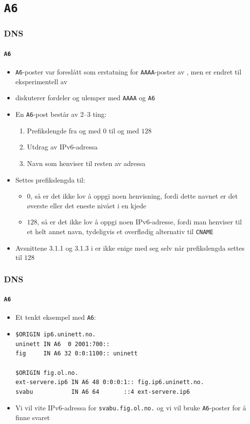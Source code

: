 \section{\texttt{A6}}
\begin{frame}[fragile]%
  \frametitle{DNS}
  \framesubtitle{\texttt{A6}}
  \pause
  \begin{itemize}[<+->]
  \item \texttt{A6}-poster var foreslått som erstatning for
    \texttt{AAAA}-poster av , men er endret til
    eksperimentell av 
  \item {} diskuterer
    fordeler og ulemper med \texttt{AAAA} og \texttt{A6}
  \item En \texttt{A6}-post består av 2--3 ting:
    \begin{enumerate}[<+->]
    \item Prefikslengde fra og med $0$ til og med $128$
    \item Utdrag av IPv6-adressa
    \item Navn som henviser til resten av adressa
    \end{enumerate}
  \item Settes prefikslengda til:
    \begin{itemize}[<+->]
    \item $0$, så er det \alert{ikke} lov å oppgi noen henvisning,
      fordi dette navnet er det øverste eller det eneste nivået i en
      kjede
    \item $128$, så er det \alert{ikke} lov å oppgi noen IPv6-adresse,
      fordi man henviser til et helt annet navn, tydeligvis et
      overflødig alternativ til \texttt{CNAME}
    \end{itemize}
  \item Avsnittene 3.1.1 og 3.1.3 i  er ikke enige med seg
    selv når prefikslengda settes til $128$
  \end{itemize}
\end{frame}

\begin{frame}[fragile]%
  \frametitle{DNS}
  \framesubtitle{\texttt{A6}}
  \begin{itemize}[<+->]
  \item Et tenkt eksempel med \texttt{A6}:
  \item 
\begin{verbatim}
$ORIGIN ip6.uninett.no.
uninett IN A6  0 2001:700::
fig     IN A6 32 0:0:1100:: uninett

$ORIGIN fig.ol.no.
ext-servere.ip6 IN A6 48 0:0:0:1:: fig.ip6.uninett.no.
svabu           IN A6 64       ::4 ext-servere.ip6
\end{verbatim}
  \item Vi vil vite IPv6-adressa for \texttt{svabu.fig.ol.no.} og vi
    vil bruke \texttt{A6}-poster for å finne svaret
  \end{itemize}
\end{frame}


